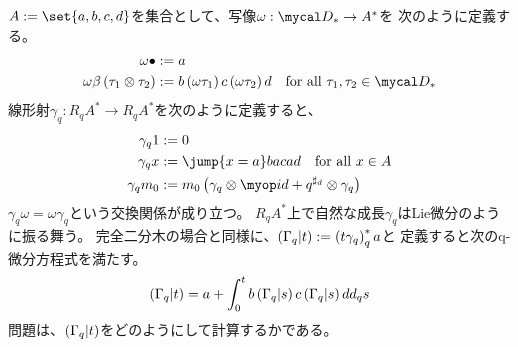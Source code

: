 {	\begin{todo}[木の成長とLie微分]\label{todo:木の成長とLie微分} %
		$A:=\set{a,b,c,d}$を集合として、写像$\omega:\D_*\to A^*$を
		次のように定義する。
		\begin{equation*}\begin{split}
			\omega\bullet &:= a \\
			\omega\beta\lr{\tau_1\otimes\tau_2}
			&:= b\lr{\omega\tau_1}c\lr{\omega\tau_2}d
				\quad\text{for all } \tau_1,\tau_2\in\D_*
		\end{split}\end{equation*}
		線形射$\gamma_q:R_qA^*\to R_qA^*$を次のように定義すると、
		\begin{equation*}\begin{split}
			\gamma_q1 &:= 0 \\
			\gamma_qx &:= \jump{x=a}bacad \quad\text{for all } x\in A \\
			\gamma_qm_0 
			&:= m_0\lr{\gamma_q\otimes\id + q^{\sharp_d}\otimes\gamma_q}
		\end{split}\end{equation*}
		$\gamma_q\omega=\omega\gamma_q$という交換関係が成り立つ。
		$R_qA^*$上で自然な成長$\gamma_q$はLie微分のように振る舞う。
		完全二分木の場合と同様に、$\left({\Gamma_q|t}\right):=\left({t\gamma_q}\right)_q^*a$と
		定義すると次のq-微分方程式を満たす。
		\begin{equation*}\begin{split}
			\left({\Gamma_q|t}\right) = a + \int_0^t b\left({\Gamma_q|s}\right)c\left({\Gamma_q|s}\right)d d_qs
		\end{split}\end{equation*}
		問題は、$\left({\Gamma_q|t}\right)$をどのようにして計算するかである。
	\end{todo} %

}

